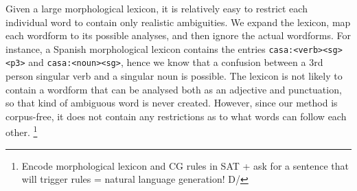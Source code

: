 Given a large morphological lexicon, it is relatively easy to restrict each individual word to contain only realistic ambiguities. We expand the lexicon, map each wordform to its possible analyses, and then ignore the actual wordforms. For instance, a Spanish morphological lexicon contains the entries \texttt{casa:<verb><sg><p3>} and \texttt{casa:<noun><sg>}, hence we know that a confusion between a 3rd person singular verb and a singular noun is possible. The lexicon is not likely to contain a wordform that can be analysed both as an adjective and punctuation, so that kind of ambiguous word is never created.
However, since our method is corpus-free, it does not contain any restrictions as to what words can follow each other. \footnote{Encode morphological lexicon and CG rules in SAT + ask for a sentence that will trigger rules = natural language generation! \:D/}








